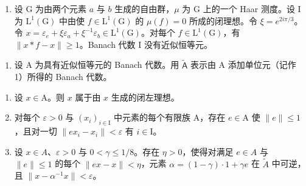 \begin{enumerate}
\def\labelenumi{\alph{enumi})}
\setcounter{enumi}{3}
\tightlist
\item
  设 G 为由两个元素 \(a\) 与 \(b\) 生成的自由群，\(\mu\) 为 G 上的一个 Haar 测度。设 I 为 \(\mathrm{L}^1 (\mathrm{G})\) 中由使 \(f\in \mathrm{L}^{1}(\mathrm{G})\) 的 \(\mu (f) = 0\) 所成的闭理想。令 \(\xi = e^{2i\pi /3}\)。令 \(x = \varepsilon_{e} + \xi \varepsilon_{a} + \xi^{-1}\varepsilon_{b}\in \mathrm{L}^{1}(\mathrm{G})\)。对每个 \(f\in \mathrm{L}^{1}(\mathrm{G})\)，有 \(\| x*f - x\| \geqslant 1\)。Banach 代数 I 没有近似恒等元。
\end{enumerate}

\begin{enumerate}
\def\labelenumi{¶ \arabic{enumi})}
\setcounter{enumi}{29}
\tightlist
\item
  设 A 为具有近似恒等元的 Banach 代数。用 \(\widetilde{\mathsf{A}}\) 表示由 A 添加单位元（记作 1）所得的 Banach 代数。
\end{enumerate}

\begin{enumerate}
\def\labelenumi{\alph{enumi})}
\item
  设 \(x \in \mathrm{A}\)。则 \(x\) 属于由 \(x\) 生成的闭左理想。
\item
  对每个 \(\varepsilon > 0\) 与 \((x_i)_{i \in \mathrm{I}}\) 中元素的每个有限族 \(\mathrm{A}\)，存在 \(e \in \mathrm{A}\) 使 \(\| e \| \leqslant 1\)，且对一切 \(\| ex_i - x_i \| < \varepsilon\) 有 \(i \in \mathrm{I}\)。
\item
  设 \(x \in A\)、\(\varepsilon > 0\) 与 \(0 < \gamma \leqslant 1/8\)。存在 \(\eta > 0\)，使得对满足 \(e \in A\) 与 \(\|e\| \leqslant 1\) 的每个 \(\|ex - x\| < \eta\)，元素 \(\alpha = (1 - \gamma) \cdot 1 + \gamma e\) 在 \(\widetilde{A}\) 中可逆，且 \(\|x - \alpha^{-1}x\| < \varepsilon\)。
\end{enumerate}

